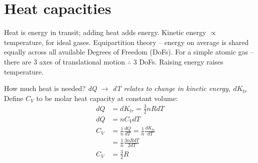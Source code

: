 \documentclass[a4paper, 11pt, normalem]{report}
\begin{document}
\section{Heat capacities}
Heat is energy in transit; adding heat adds energy.
Kinetic energy $\propto$ temperature, for ideal gases.
Equipartition theory -- energy on average is shared equally across all available Degrees of Freedom (DoFs).
For a simple atomic gas -- there are 3 axes of translational motion $\therefore$ 3 DoFs.
Raising energy raises temperature.

How much heat is needed? 
\textit{dQ $\rightarrow$ dT relates to change in kinetic energy, $dK_{tr}$}
Define $C_{V}$ to be molar heat capacity at constant volume:
\begin{align}
    dQ &= dK_{tr} = \frac{3}{2}nRdT \\
    dQ &= nC_{V}dT \\
    C_{V} &= \frac{1}{n}\frac{dQ}{dT} = \frac{1}{n}\frac{dK_{tr}}{dT} \\
          &= \frac{1}{n}\frac{3nRdT}{2dT} \\
    C_{V} &= \frac{3}{2}R
\end{align}
\end{document}
